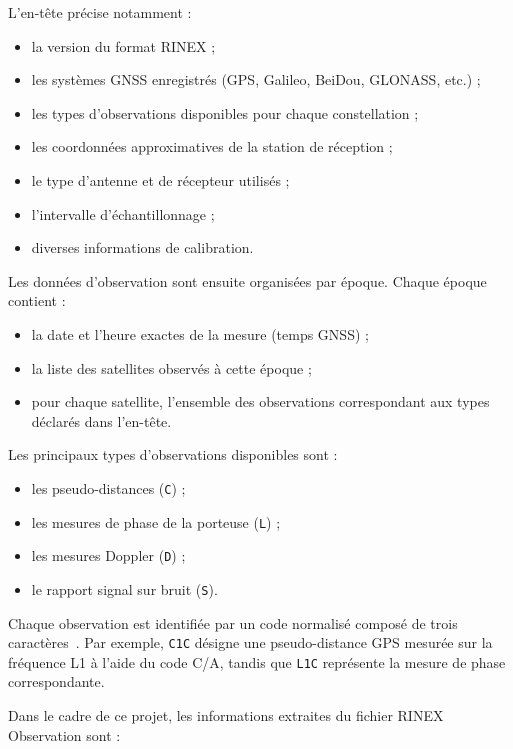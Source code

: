 L'en-tête précise notamment :

\begin{itemize}
    \item la version du format RINEX ;
    \item les systèmes GNSS enregistrés (GPS, Galileo, BeiDou, GLONASS, etc.) ;
    \item les types d'observations disponibles pour chaque constellation ;
    \item les coordonnées approximatives de la station de réception ;
    \item le type d'antenne et de récepteur utilisés ;
    \item l'intervalle d'échantillonnage ;
    \item diverses informations de calibration.
\end{itemize}

Les données d'observation sont ensuite organisées par époque. Chaque époque contient :

\begin{itemize}
    \item la date et l'heure exactes de la mesure (temps GNSS) ;
    \item la liste des satellites observés à cette époque ;
    \item pour chaque satellite, l'ensemble des observations correspondant aux types déclarés dans l'en-tête.
\end{itemize}

Les principaux types d'observations disponibles sont :

\begin{itemize}
    \item les pseudo-distances (\texttt{C}) ;
    \item les mesures de phase de la porteuse (\texttt{L}) ;
    \item les mesures Doppler (\texttt{D}) ;
    \item le rapport signal sur bruit (\texttt{S}).
\end{itemize}

Chaque observation est identifiée par un code normalisé composé de trois caractères~\cite{rinex304}. Par exemple, \texttt{C1C} désigne une pseudo-distance GPS mesurée sur la fréquence L1 à l'aide du code C/A, tandis que \texttt{L1C} représente la mesure de phase correspondante.

Dans le cadre de ce projet, les informations extraites du fichier RINEX Observation sont :

